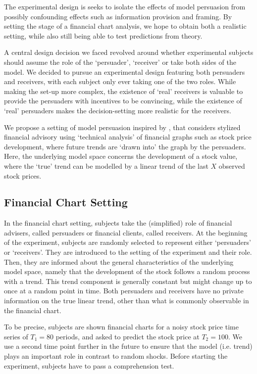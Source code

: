 \documentclass[11pt, a4paper, leqno]{article}
\begin{document}
The experimental design is seeks to isolate the effects of model persuasion from possibly confounding effects such as information provision and framing. By setting the stage of a financial chart analysis, we hope to obtain both a realistic setting, while also still being able to test predictions from theory.



A central design decision we faced revolved around whether experimental subjects should assume the role of the `persuader', `receiver' or take both sides of the model. We decided to pursue an experimental design featuring both persuaders and receivers, with each subject only ever taking one of the two roles.
While making the set-up more complex, the existence of `real' receivers is valuable to provide the persuaders with incentives to be convincing, while the existence of `real' persuaders makes the decision-setting more realistic for the receivers. 

We propose a setting of model persuasion inspired by \citet{Schwartzstein}, that considers stylized financial advisory using `technical analysis' of financial graphs such as stock price development, where future trends are `drawn into' the graph by the persuaders. Here, the underlying model space concerns the development of a stock value, where the `true' trend can be modelled by a linear trend of the last $X$ observed stock prices. 

\subsection{Financial Chart Setting}

In the financial chart setting, subjects take the (simplified) role of financial advisers, called persuaders or financial clients, called receivers. At the beginning of the experiment, subjects are randomly selected to represent either `persuaders' or `receivers'. They are introduced to the setting of the experiment and their role. Then, they are  informed about the general characteristics of the underlying model space, namely that the development of the stock follows a random process with a trend. This trend component is generally constant but might change up to once at a random point in time. Both persuaders and receivers have no private information on the true linear trend, other than what is commonly observable in the financial chart. 

To be precise, subjects are shown financial charts for a noisy stock price time series of $T_1=80$ periods, and asked to predict the stock price at $T_2=100$. We use a second time point further in the future to ensure that the model (i.e. trend) plays an important role in contrast to random shocks. Before starting the experiment, subjects have to pass a comprehension test.
\end{document}
